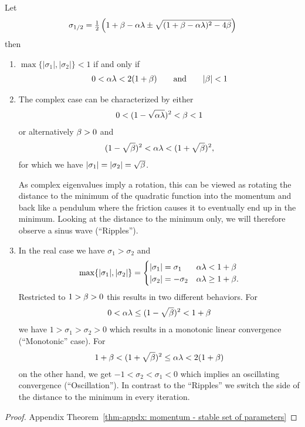 \begin{theorem}
	\label{thm: momentum - stable set of parameters}
	Let
	\begin{align*}
		\sigma_{1/2}
		= \tfrac12 \left(
			1+\beta-\alpha\lambda \pm \sqrt{(1+\beta-\alpha\lambda)^2 - 4\beta}
		\right)
	\end{align*}
	then 
	\begin{enumerate}
		\item \(\max\{|\sigma_1|,|\sigma_2|\}<1\) if and only if
		\begin{align*}
			0<\alpha\lambda < 2(1+\beta) \qquad \text{and} \qquad |\beta|<1
		\end{align*}
		\item The complex case can be characterized by either
		\begin{align*}
			0<(1-\sqrt{\alpha\lambda})^2 < \beta < 1
		\end{align*}		
		or alternatively \(\beta>0\) and
		\begin{align*}
			(1-\sqrt{\beta})^2 < \alpha\lambda < (1+\sqrt{\beta})^2,
		\end{align*}
		for which we have \(|\sigma_1|=|\sigma_2|=\sqrt{\beta}\).
		
		As complex
		eigenvalues imply a rotation, this can be viewed as rotating the distance
		to the minimum of the quadratic function into the momentum and back like 
		a pendulum where the friction causes it to eventually end up in the
		minimum. Looking at the distance to the minimum only, we will therefore
		observe a sinus wave (``Ripples'').
		\item In the real case we have \(\sigma_1>\sigma_2\) and
		\begin{align}
			\max\{|\sigma_1|, |\sigma_2|\} = \begin{cases}
				|\sigma_1|=\sigma_1 & \alpha\lambda < 1+\beta \\
				|\sigma_2|=-\sigma_2 & \alpha\lambda \ge 1+\beta.
			\end{cases}
		\end{align}
		Restricted to \(1>\beta>0\) this results in two different	
		behaviors. For
		\begin{align*}
			0<\alpha\lambda \le (1-\sqrt{\beta})^2 < 1+\beta
		\end{align*}
		we have \(1>\sigma_1 > \sigma_2 > 0\) which results in a monotonic
		linear convergence (``Monotonic'' case). For
		\begin{align*}
			1+\beta < (1+\sqrt{\beta})^2\le \alpha\lambda < 2(1+\beta)
		\end{align*}
		on the other hand, we get \(-1 < \sigma_2 < \sigma_1 < 0\) which implies 
		an oscillating convergence (``Oscillation''). In contrast to the ``Ripples''
		we switch the side of the distance to the minimum in every iteration.
	\end{enumerate}
\end{theorem}
\begin{proof}
	Appendix Theorem~\ref{thm-appdx: momentum - stable set of parameters}
\end{proof}

